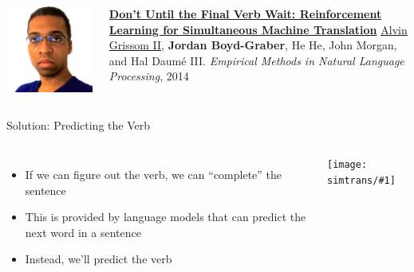 \documentclass[compress]{beamer}
\newcommand{\gfxs}[2]{
\begin{center}
	\texttt{[image: simtrans/\#1]}
\end{center}
}
\begin{document}
\begin{frame}{}

  \begin{columns}
        \includegraphics[width=0.9\linewidth]{general_figures/alvin}
        \begin{block}{ {\bf \href{http://cs.colorado.edu/~jbg//docs/2014_emnlp_simtrans.pdf}{Don't Until the Final Verb Wait: Reinforcement Learning for Simultaneous Machine Translation}}}
\underline{\href{http://www.umiacs.umd.edu/~alvin/}{Alvin Grissom II}}, {\bf Jordan Boyd-Graber}, He He, John Morgan, and Hal {Daum\'{e} III}.  \emph{Empirical Methods in Natural Language Processing}, 2014
        \end{block}
  \end{columns}
\end{frame}

\begin{frame}{Solution: Predicting the Verb}

\begin{columns}

  \begin{itemize}
    \item If we can figure out the verb, we can ``complete'' the
      sentence
    \item This is provided by language models that can predict the
      next word in a sentence
    \item Instead, we'll predict the verb
  \end{itemize}


\gfxs{autocomplete}{.8}

\end{columns}

\end{frame}
\end{document}
